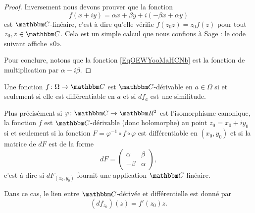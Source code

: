 \begin{proof}
    Inversement nous devons prouver que la fonction 
    \begin{equation}        \label{EqOEWYooMaHCNb}
        f(x+iy)=\alpha x+\beta y+i(-\beta x+\alpha y)
    \end{equation}
    est \( \eC\)-linéaire, c'est à dire qu'elle vérifie \( f(z_0z)=z_0f(z)\) pour tout \( z_0,z\in \eC\). Cela est un simple calcul que nous confions à Sage : le code suivant affiche «\( 0\)».
    

    Pour conclure, notons que la fonction \eqref{EqOEWYooMaHCNb} est la fonction de multiplication par \( \alpha-i\beta\).
\end{proof}

\begin{proposition}     \label{PropKJUDooJfqgYS}
    Une fonction \( f\colon \Omega\to \eC\) est $\eC$-dérivable en \( a\in\Omega\) si et seulement si elle est différentiable en \( a\) et si \( df_a\) est une similitude.

    Plus précisément si \( \varphi\colon \eC\to \eR^2\) est l'isomorphisme canonique, la fonction \( f\) est $\eC$-dérivable (donc holomorphe) au point \( z_0=x_0+iy_0\) si et seulement si la fonction \( F=\varphi^{-1}\circ f\circ \varphi\) est différentiable en \( (x_0,y_0)\) et si la matrice de \( dF\) est de la forme
    \begin{equation}
        dF=\begin{pmatrix}
            \alpha    &   \beta    \\ 
            -\beta    &   \alpha    
        \end{pmatrix},
    \end{equation}
    c'est à dire si \( dF_{(x_0,y_0)}\) fournit une application \( \eC\)-linéaire.

    Dans ce cas, le lien entre \( \eC\)-dérivée et différentielle est donné par
    \begin{equation}        \label{EqPAEFooYNhYpz}
        (df_{z_0})(z)=f'(z_0)z.
    \end{equation}
\end{proposition}

